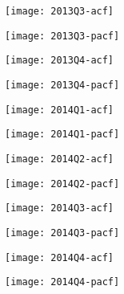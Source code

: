 \begin{figure}[htp]
	\centering
	\begin{subfigure}{0.23\textwidth}
		\centering
		\texttt{[image: 2013Q3-acf]}
	\end{subfigure}
	\begin{subfigure}{0.23\textwidth}
		\centering
		\texttt{[image: 2013Q3-pacf]}
	\end{subfigure}
	\begin{subfigure}{0.23\textwidth}
		\centering
		\texttt{[image: 2013Q4-acf]}
	\end{subfigure}
	\begin{subfigure}{0.23\textwidth}
		\centering
		\texttt{[image: 2013Q4-pacf]}
	\end{subfigure}
\end{figure}



\begin{figure}[htp]
	\centering
	\begin{subfigure}{0.23\textwidth}
		\centering
		\texttt{[image: 2014Q1-acf]}
	\end{subfigure}
	\begin{subfigure}{0.23\textwidth}
		\centering
		\texttt{[image: 2014Q1-pacf]}
	\end{subfigure}
	\begin{subfigure}{0.23\textwidth}
		\centering
		\texttt{[image: 2014Q2-acf]}
	\end{subfigure}
	\begin{subfigure}{0.23\textwidth}
		\centering
		\texttt{[image: 2014Q2-pacf]}
	\end{subfigure}
\end{figure}

\begin{figure}[htp]
	\centering
	\begin{subfigure}{0.23\textwidth}
		\centering
		\texttt{[image: 2014Q3-acf]}
	\end{subfigure}
	\begin{subfigure}{0.23\textwidth}
		\centering
		\texttt{[image: 2014Q3-pacf]}
	\end{subfigure}
	\begin{subfigure}{0.23\textwidth}
		\centering
		\texttt{[image: 2014Q4-acf]}
	\end{subfigure}
	\begin{subfigure}{0.23\textwidth}
		\centering
		\texttt{[image: 2014Q4-pacf]}
	\end{subfigure}
\end{figure}


